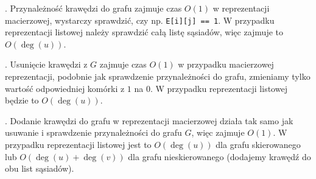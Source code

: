 \documentclass[a4paper,12pt]{article}
\newcommand{\code}[1]{\lstinline[style=code]{#1}} %
\begin{document}
\noindent {}. Przynależność krawędzi do grafu zajmuje czas $O(1)$ w reprezentacji 
macierzowej, wystarczy sprawdzić, czy np. \code{E[i][j] == 1}. W przypadku reprezentacji
listowej należy sprawdzić całą listę sąsiadów, więc zajmuje to $O(\deg(u))$.

\noindent {}. Usunięcie krawędzi z $G$ zajmuje czas $O(1)$ w przypadku macierzowej
reprezentacji, podobnie jak sprawdzenie przynależności do grafu, zmieniamy tylko wartość
odpowiedniej komórki z $1$ na $0$. W przypadku reprezentacji listowej będzie to $O(\deg(u))$. 

\noindent {}. Dodanie krawędzi do grafu w reprezentacji macierzowej działa 
tak samo jak usuwanie i sprawdzenie przynależności do grafu $G$, więc zajmuje $O(1)$.
W przypadku reprezentacji listowej jest to $O(\deg(u))$ dla grafu skierowanego lub
$O(\deg(u) + \deg(v))$ dla grafu nieskierowanego (dodajemy krawędź do obu list sąsiadów). 
\end{document}
